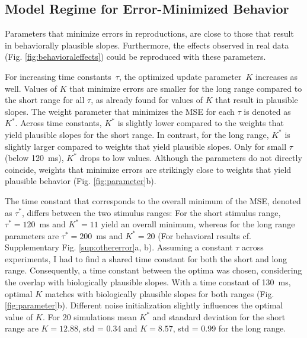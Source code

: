 \documentclass[10pt, a4paper]{article}
\begin{document}
\subsection{Model Regime for Error-Minimized Behavior}
Parameters that minimize errors in reproductions, are close to those that result in behaviorally plausible slopes. Furthermore, the effects observed in real data (Fig. \ref{fig:behavioraleffects}) could be reproduced with these parameters.

For increasing time constants~$\tau$, the optimized update parameter~$K$ increases as well. Values of $K$ that minimize errors are smaller for the long range compared to the short range for all $\tau$, as already found for values of $K$ that result in plausible slopes.
The weight parameter that minimizes the MSE for each $\tau$ is denoted as $K^*$. Across time constants,  $K^*$ is slightly lower compared to the weights that yield plausible slopes for the short range. In contrast, for the long range, $K^*$ is slightly larger compared to  weights that yield plausible slopes. Only for small $\tau$ (below 120~ms), $K^*$ drops to low values.
Although the parameters do not directly coincide, weights that minimize errors are strikingly close to weights that yield plausible behavior (Fig. \ref{fig:parameter}b). 

The time constant that corresponds to the overall minimum of the MSE, denoted as $\tau^*$, differs between the two stimulus ranges:
For the short stimulus range, $\tau^* = 120$~ms and $K^* = 11$ yield an overall minimum, whereas for the long range parameters are $\tau^* = 200$~ms and $K^* = 20$ (For behavioral results cf. Supplementary Fig. \ref{sup:othererror}a, b).
Assuming a constant $\tau$ across experiments, I had to find a shared time constant for both the short and long range. 
Consequently, a time constant between the optima was chosen, considering the overlap with biologically plausible slopes.
With a time constant of 130~ms, optimal $K$ matches with biologically plausible slopes for both ranges (Fig. \ref{fig:parameter}b).
Different noise initialization slightly influences the optimal value of $K$. For 20 simulations mean $K^*$ and standard deviation for the short range are $K = 12.88$, std = 0.34 and $K = 8.57$, std = 0.99 for the long range. 
\end{document}
